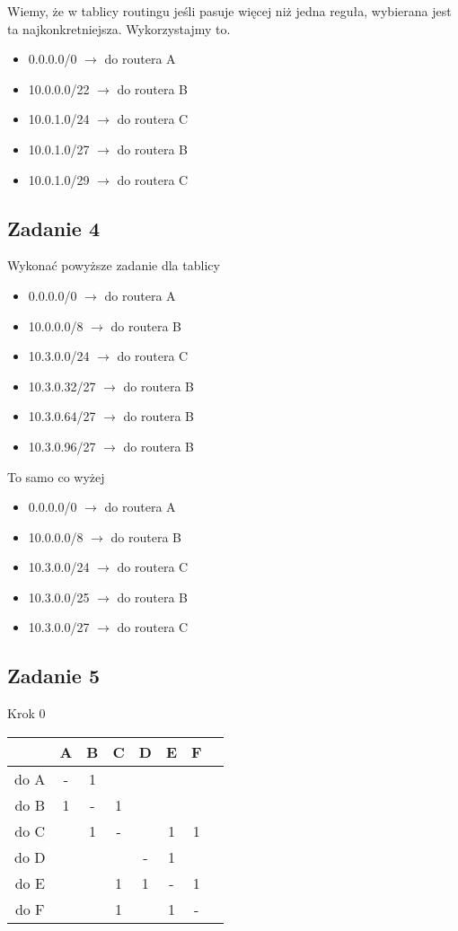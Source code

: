 \documentclass[a4paper]{article}
\begin{document}
Wiemy, że w tablicy routingu jeśli pasuje więcej niż jedna reguła, wybierana jest ta najkonkretniejsza. Wykorzystajmy to.

\begin{itemize}
\item 0.0.0.0/0 $\rightarrow$ do routera A
\item 10.0.0.0/22 $\rightarrow$ do routera B
\item 10.0.1.0/24 $\rightarrow$ do routera C
\item 10.0.1.0/27 $\rightarrow$ do routera B
\item 10.0.1.0/29 $\rightarrow$ do routera C
\end{itemize}

\clearpage
\subsection*{Zadanie 4}
Wykonać powyższe zadanie dla tablicy

\begin{itemize}
\item 0.0.0.0/0 $\rightarrow$ do routera A
\item 10.0.0.0/8 $\rightarrow$ do routera B
\item 10.3.0.0/24 $\rightarrow$ do routera C
\item 10.3.0.32/27 $\rightarrow$ do routera B
\item 10.3.0.64/27 $\rightarrow$ do routera B
\item 10.3.0.96/27 $\rightarrow$ do routera B
\end{itemize}

To samo co wyżej

\begin{itemize}
\item 0.0.0.0/0 $\rightarrow$ do routera A
\item 10.0.0.0/8 $\rightarrow$ do routera B
\item 10.3.0.0/24 $\rightarrow$ do routera C
\item 10.3.0.0/25 $\rightarrow$ do routera B
\item 10.3.0.0/27 $\rightarrow$ do routera C
\end{itemize}

\clearpage
\subsection*{Zadanie 5}
Krok 0\\
\begin{tabular}{|c *{6}{|c} |c|}\hline
 & A & B & C & D & E & F\\
\hline 
do A & - & 1 & & & &\\
\hline 
do B & 1 & - & 1 & & &\\
\hline 
do C & & 1 & - & & 1 & 1\\
\hline 
do D & & & & - & 1 &\\
\hline 
do E & & & 1 & 1 & - & 1\\
\hline
do F & & & 1 & & 1 & -\\
\hline
\end{tabular}
\end{document}
